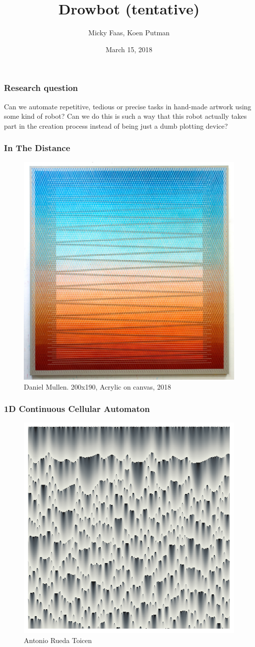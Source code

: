 \documentclass[12pt]{beamer}
\title[ Drowbot (tentative)] %
{\large Drowbot (tentative)}
\author[Micky Faas, Koen Putman]{Micky Faas, Koen Putman}
\institute[] %
{ Leiden University - LIACS }
\date{March 15, 2018}
\begin{document}
\frame{\titlepage}
\begin{frame}[c]\frametitle{Research question}
\large
Can we automate repetitive, tedious or precise tasks in hand-made artwork using some kind of robot?
Can we do this is such a way that this robot actually takes part in the creation process instead of being just a dumb plotting device?
\end{frame}

\begin{frame}[c]\frametitle{In The Distance}
\begin{figure}
  \centering
  \includegraphics[width=.6\textwidth]{images/inthedistance.jpg}
  \caption{Daniel Mullen. 200x190, Acrylic on canvas, 2018}
\end{figure}
\end{frame}

\begin{frame}[c]\frametitle{1D Continuous Cellular Automaton}
\begin{figure}
  \centering
  \includegraphics[width=.6\textwidth]{images/1d_cont_ca.png}
  \caption{Antonio Rueda Toicen}
\end{figure}
\end{frame}
\end{document}
